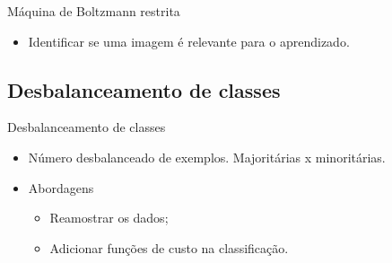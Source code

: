 \documentclass{beamer}
\begin{document}
\begin{frame}{Máquina de Boltzmann restrita}
\setlength\leftmargini{0em}
\justifying
{}
\begin{itemize}
  \item Identificar se uma imagem é relevante para o aprendizado.
\end{itemize}

\end{frame}

\subsection{Desbalanceamento de classes}
\begin{frame}{Desbalanceamento de classes}
\setlength\leftmargini{0em}
\justifying
{}
\begin{itemize}
  \item Número desbalanceado de exemplos. Majoritárias x minoritárias.
  \item Abordagens
    \begin{itemize}
        \item Reamostrar os dados;
        \item Adicionar funções de custo na classificação.
    \end{itemize}
\end{itemize}



\end{frame}
\end{document}
